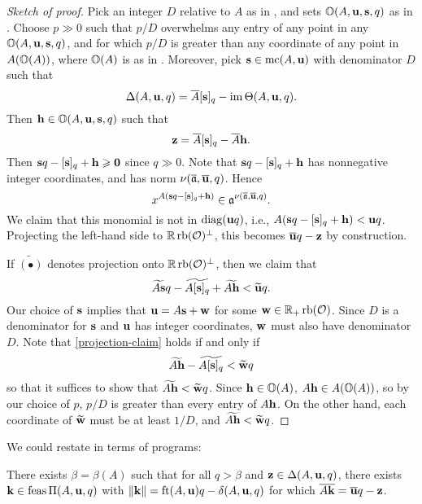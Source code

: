 \documentclass[11pt]{amsart}
\begin{document}
\begin{proof}[Sketch of proof]
Pick an integer $D$ relative to $A$ as in 
, and sets $\mathbb{O}(A, \mathbf{u}, \mathbf{s},q)$ as in . 
Choose $p \gg 0$ such that $p/D$ overwhelms any entry of any point in any $\mathbb{O}(A, \mathbf{u}, \mathbf{s},q)$, and for which $p/D$ is greater than any coordinate of any point in $A(\mathbb{O}(A))$, where $\mathbb{O}(A)$ is as in .
Moreover, pick $\mathbf{s} \in \operatorname{mc}(A,\mathbf{u})
$ with denominator $D$ such that 
\[
 \Delta(A, \mathbf{u}, q) = \overline{A}[\mathbf{s}]_q - \operatorname{im} \Theta(A, \mathbf{u}, q).
\]
Then $\mathbf{h} \in \mathbb{O}(A, \mathbf{u}, \mathbf{s},q)$ such that 
\[
 \mathbf{z} = \overline{A}[\mathbf{s}]_q - \overline{A} \mathbf{h}.
\] 
Then
$\mathbf{s} q - [\mathbf{s}]_q + \mathbf{h} \geqslant \mathbf{0}$ since $q \gg 0$.  Note that $\mathbf{s} q - [\mathbf{s}]_q + \mathbf{h}$ has nonnegative integer coordinates, and has norm $\nu(\overline{\mathfrak{a}}, \overline{\mathbf{u}}, q)$.  
Hence
\[
 x^{A(\mathbf{s} q - [\mathbf{s}]_q + \mathbf{h})} \in \mathfrak{a}^{\nu(\overline{\mathfrak{a}}, \overline{\mathbf{u}}, q)}.
\]
We claim that this monomial is not in $\operatorname{diag}(\mathbf{u}q)$, i.e., 
$A(\mathbf{s} q - [\mathbf{s}]_q + \mathbf{h}) < \mathbf{u} q$. 
Projecting the left-hand side to  $\mathbb{R} \operatorname{rb}(\mathcal{O})^\perp$, this becomes $\overline{\mathbf{u}} q - \mathbf{z}$ by construction. 

If $\widetilde{(\bullet)}$ denotes projection onto $\mathbb{R} \operatorname{rb}(\mathcal{O})^\perp$, then we claim that 
\begin{equation} \label{projection-claim}
 \widetilde{A \mathbf{s}} q - \widetilde{A [\mathbf{s}]_q} + \widetilde{A \mathbf{h}} < \widetilde{\mathbf{u}} q.
\end{equation}
Our choice of $\mathbf{s}$ implies that $\mathbf{u} = A \mathbf{s} + \mathbf{w}$ for some $\mathbf{w} \in \mathbb{R}_+ \operatorname{rb}(\mathcal{O})$. Since $D$ is a denominator for $\mathbf{s}$ and $\mathbf{u}$ has integer coordinates, $\mathbf{w}$ must also have denominator $D$. 
Note that \eqref{projection-claim} holds if and only if
\[
  \widetilde{A \mathbf{h}} - \widetilde{A [\mathbf{s}]_q} < \widetilde{\mathbf{w}} q
\]
so that it suffices to show that $  \widetilde{A \mathbf{h}}  < \widetilde{\mathbf{w}} q$. 
Since $\mathbf{h} \in \mathbb{O}(A)$, $A\mathbf{h} \in A(\mathbb{O}(A))$, so by our choice of $p$, $p/D$ is greater than every entry of $A \mathbf{h}$.  On the other hand, each coordinate of $\widetilde{\mathbf{w}}$ must be at least $1/D$, and $\widetilde{A \mathbf{h}}  < \widetilde{\mathbf{w}} q$.
\end{proof}

We could restate in terms of programs:
\begin{lemma}
There exists $\beta = \beta(A)$ such that for all $q > \beta$ and $\mathbf{z} \in \Delta(A, \mathbf{u}, q)$, there exists $\mathbf{k} \in \operatorname{feas} \Pi(A, \mathbf{u}, q)$ with $\| \mathbf{k} \| = \operatorname{ft}(A, \mathbf{u}) q - \delta(A, \mathbf{u}, q)$ for which $\overline{A \mathbf{k}} = \overline{\mathbf{u}} q - \mathbf{z}$. 
\end{lemma}
\end{document}
